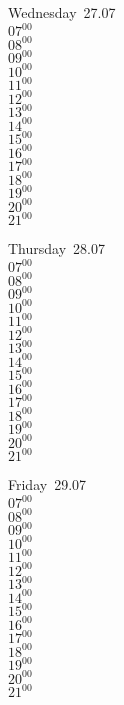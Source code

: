 \documentclass[11pt,a4paper]{book}\usepackage[]{graphicx}\usepackage[]{color}
\begin{document}
\begin{weekdaybox}
  Wednesday~27.07\\
  { 
  \vfill
  $07^{00}$\\
$08^{00}$\\
$09^{00}$\\
$10^{00}$\\
$11^{00}$\\
$12^{00}$\\
$13^{00}$\\
$14^{00}$\\
$15^{00}$\\
$16^{00}$\\
$17^{00}$\\
$18^{00}$\\
$19^{00}$\\
$20^{00}$\\
$21^{00}$\\
  }
\end{weekdaybox}
\clearpage
\begin{headerbox}
\end{headerbox}
\begin{weekdaybox}
  Thursday~28.07\\
  { 
  \vfill
  $07^{00}$\\
$08^{00}$\\
$09^{00}$\\
$10^{00}$\\
$11^{00}$\\
$12^{00}$\\
$13^{00}$\\
$14^{00}$\\
$15^{00}$\\
$16^{00}$\\
$17^{00}$\\
$18^{00}$\\
$19^{00}$\\
$20^{00}$\\
$21^{00}$\\
  }
\end{weekdaybox} 
\begin{weekdaybox}
  Friday~29.07\\
  { 
  \vfill
  $07^{00}$\\
$08^{00}$\\
$09^{00}$\\
$10^{00}$\\
$11^{00}$\\
$12^{00}$\\
$13^{00}$\\
$14^{00}$\\
$15^{00}$\\
$16^{00}$\\
$17^{00}$\\
$18^{00}$\\
$19^{00}$\\
$20^{00}$\\
$21^{00}$\\
  }
\end{weekdaybox}
\end{document}
